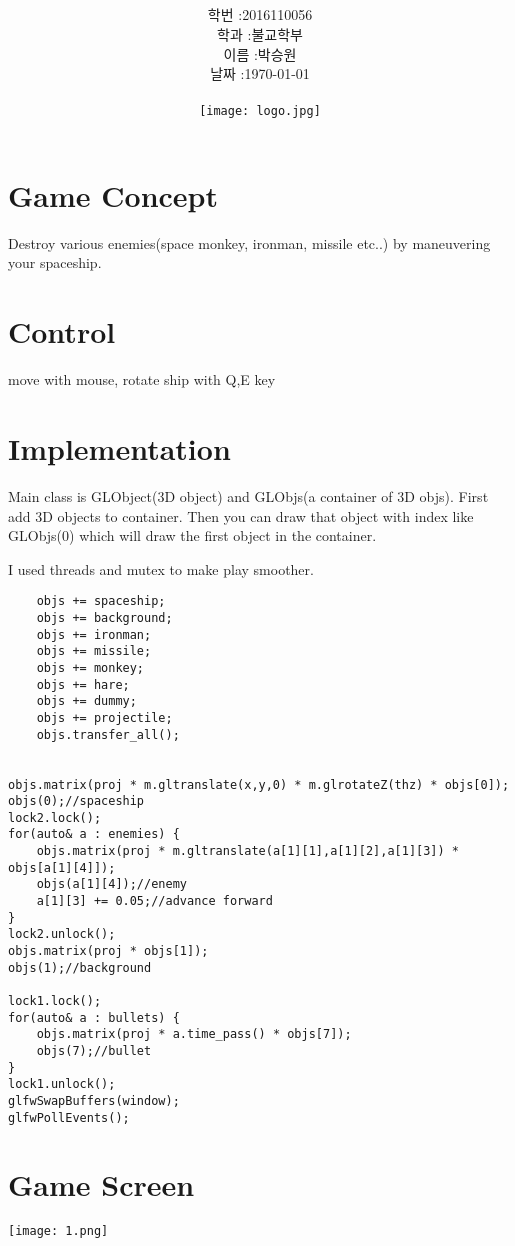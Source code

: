 \documentclass[12pt,a4paper]{article}
\title{
	\centering
	\pgfornament[width=12cm,color=teal]{84}\\
	\vspace{1cm}
	\fontsize{50}{50} \selectfont {
	3D Game Development\\Space War}
		\pgfornament[width=12cm,color=teal]{88}\\
	\vfill}
\author{
	\LARGE
	\begin{tabular}{rl}
		\hline
		학번 : & 2016110056\\ 
		학과 : & 불교학부 \\
		이름 : & 박승원\\
		날짜 : & \today\\
		\hline
	\end{tabular}\vspace{2cm}
	\\
\texttt{[image: logo.jpg]}
	}
\date{}
\begin{document}
\maketitle
{}
\noindent
\lstset{language=C++, columns=flexible, tabsize=4, frame=shadowbox, showstringspaces=false, breaklines=true, upquote=true, basicstyle=\normalsize}
\newpage
\section{Game Concept}
Destroy various enemies(space monkey, ironman, missile etc..) by maneuvering your spaceship.

\section{Control}
move with mouse, rotate ship with Q,E key

\section{Implementation}
Main class is GLObject(3D object) and GLObjs(a container of 3D objs).
First add 3D objects to container.
Then you can draw that object with index like GLObjs(0) which will draw the first object in the container.

I used threads and mutex to make play smoother.
\begin{lstlisting}
	objs += spaceship;
	objs += background;
	objs += ironman;
	objs += missile;
	objs += monkey;
	objs += hare;
	objs += dummy;
	objs += projectile;
	objs.transfer_all();


objs.matrix(proj * m.gltranslate(x,y,0) * m.glrotateZ(thz) * objs[0]);
objs(0);//spaceship
lock2.lock();
for(auto& a : enemies) {
	objs.matrix(proj * m.gltranslate(a[1][1],a[1][2],a[1][3]) * objs[a[1][4]]);
	objs(a[1][4]);//enemy
	a[1][3] += 0.05;//advance forward
}
lock2.unlock();
objs.matrix(proj * objs[1]);
objs(1);//background
	
lock1.lock();
for(auto& a : bullets) {
	objs.matrix(proj * a.time_pass() * objs[7]);
	objs(7);//bullet
}
lock1.unlock();
glfwSwapBuffers(window);
glfwPollEvents();

\end{lstlisting}

\section{Game Screen}
\texttt{[image: 1.png]}
\end{document}
